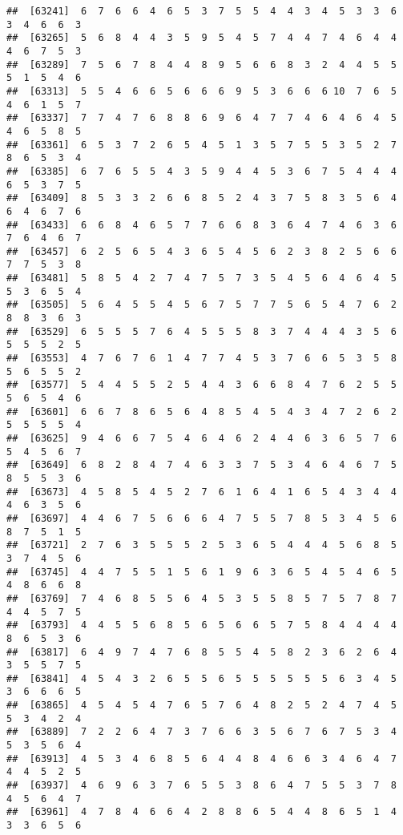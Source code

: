 \documentclass[
]{book}
\begin{document}
\begin{verbatim}
##  [63241]  6  7  6  6  4  6  5  3  7  5  5  4  4  3  4  5  3  3  6  3  4  6  6  3
##  [63265]  5  6  8  4  4  3  5  9  5  4  5  7  4  4  7  4  6  4  4  4  6  7  5  3
##  [63289]  7  5  6  7  8  4  4  8  9  5  6  6  8  3  2  4  4  5  5  5  1  5  4  6
##  [63313]  5  5  4  6  6  5  6  6  6  9  5  3  6  6  6 10  7  6  5  4  6  1  5  7
##  [63337]  7  7  4  7  6  8  8  6  9  6  4  7  7  4  6  4  6  4  5  4  6  5  8  5
##  [63361]  6  5  3  7  2  6  5  4  5  1  3  5  7  5  5  3  5  2  7  8  6  5  3  4
##  [63385]  6  7  6  5  5  4  3  5  9  4  4  5  3  6  7  5  4  4  4  6  5  3  7  5
##  [63409]  8  5  3  3  2  6  6  8  5  2  4  3  7  5  8  3  5  6  4  6  4  6  7  6
##  [63433]  6  6  8  4  6  5  7  7  6  6  8  3  6  4  7  4  6  3  6  7  6  4  6  7
##  [63457]  6  2  5  6  5  4  3  6  5  4  5  6  2  3  8  2  5  6  6  7  7  5  3  8
##  [63481]  5  8  5  4  2  7  4  7  5  7  3  5  4  5  6  4  6  4  5  5  3  6  5  4
##  [63505]  5  6  4  5  5  4  5  6  7  5  7  7  5  6  5  4  7  6  2  8  8  3  6  3
##  [63529]  6  5  5  5  7  6  4  5  5  5  8  3  7  4  4  4  3  5  6  5  5  5  2  5
##  [63553]  4  7  6  7  6  1  4  7  7  4  5  3  7  6  6  5  3  5  8  5  6  5  5  2
##  [63577]  5  4  4  5  5  2  5  4  4  3  6  6  8  4  7  6  2  5  5  5  6  5  4  6
##  [63601]  6  6  7  8  6  5  6  4  8  5  4  5  4  3  4  7  2  6  2  5  5  5  5  4
##  [63625]  9  4  6  6  7  5  4  6  4  6  2  4  4  6  3  6  5  7  6  5  4  5  6  7
##  [63649]  6  8  2  8  4  7  4  6  3  3  7  5  3  4  6  4  6  7  5  8  5  5  3  6
##  [63673]  4  5  8  5  4  5  2  7  6  1  6  4  1  6  5  4  3  4  4  4  6  3  5  6
##  [63697]  4  4  6  7  5  6  6  6  4  7  5  5  7  8  5  3  4  5  6  8  7  5  1  5
##  [63721]  2  7  6  3  5  5  5  2  5  3  6  5  4  4  4  5  6  8  5  3  7  4  5  6
##  [63745]  4  4  7  5  5  1  5  6  1  9  6  3  6  5  4  5  4  6  5  4  8  6  6  8
##  [63769]  7  4  6  8  5  5  6  4  5  3  5  5  8  5  7  5  7  8  7  4  4  5  7  5
##  [63793]  4  4  5  5  6  8  5  6  5  6  6  5  7  5  8  4  4  4  4  8  6  5  3  6
##  [63817]  6  4  9  7  4  7  6  8  5  5  4  5  8  2  3  6  2  6  4  3  5  5  7  5
##  [63841]  4  5  4  3  2  6  5  5  6  5  5  5  5  5  5  6  3  4  5  3  6  6  6  5
##  [63865]  4  5  4  5  4  7  6  5  7  6  4  8  2  5  2  4  7  4  5  5  3  4  2  4
##  [63889]  7  2  2  6  4  7  3  7  6  6  3  5  6  7  6  7  5  3  4  5  3  5  6  4
##  [63913]  4  5  3  4  6  8  5  6  4  4  8  4  6  6  3  4  6  4  7  4  4  5  2  5
##  [63937]  4  6  9  6  3  7  6  5  5  3  8  6  4  7  5  5  3  7  8  4  5  6  4  7
##  [63961]  4  7  8  4  6  6  4  2  8  8  6  5  4  4  8  6  5  1  4  3  3  6  5  6

\end{verbatim}
\end{document}
